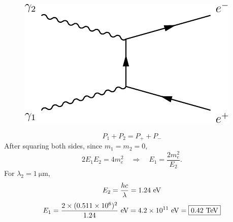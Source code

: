 \begin{figure}[H]
  \centering
  \includegraphics{feynmp/yy_ee.pdf}
\end{figure}

\begin{equation}
  P_1 + P_2 = P_{+} + P_{-}
\end{equation}
After squaring both sides, since $m_1=m_2=0$,
\begin{equation}
  2E_1E_2 = 4m_e^2 \quad \Rightarrow \quad E_1 = \frac{2m_e^2}{E_2}.
\end{equation}
%
For $\lambda_2 = \SI{1}{\micro\meter}$,
\begin{equation}
  E_2 = \frac{hc}{\lambda} = 1.24~\text{eV}
\end{equation}
\begin{equation}
  E_1 = \frac{2\times (0.511\times 10^6)^2}{1.24} ~\text{eV}
      = 4.2\times 10^{11} ~\text{eV} = \boxed{ 0.42 ~\text{TeV} }
\end{equation}



